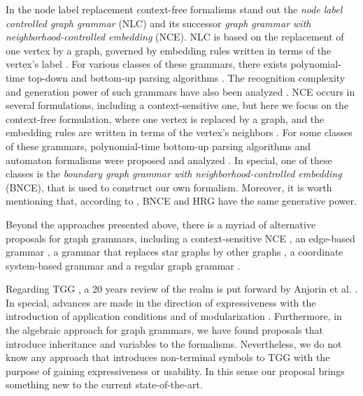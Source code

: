 In the node label replacement context-free formalisms stand out the  \textit{node label controlled graph grammar} (NLC) and its successor \textit{graph grammar with neighborhood-controlled embedding} (NCE). NLC is based on the replacement of one vertex by a graph, governed by embedding rules written in terms of the vertex's label \cite{rozenberg1986boundary}. For various classes of these grammars, there exists polynomial-time top-down and bottom-up parsing algorithms \cite{flasinski1993parsing,flasinski2014characteristics, rozenberg1986boundary, wanke1991algorithms}. The recognition complexity and generation power of such grammars have also been analyzed \cite{flasinski1998power,kim2012structure}. NCE occurs in several formulations, including a context-sensitive one, but here we focus on the context-free formulation, where one vertex is replaced by a graph, and the embedding rules are written in terms of the vertex's neighbors \cite{janssens1982graph,skodinis1998neighborhood}. For some classes of these grammars, polynomial-time bottom-up parsing algorithms and automaton formalisms were proposed and analyzed \cite{kim2001efficient,brandenburg2005finite}. In special, one of these classes is the \textit{boundary graph grammar with neighborhood-controlled embedding} (BNCE), that is used to construct our own formalism. Moreover, it is worth mentioning that, according to \cite{engelfiet1990comparison}, BNCE and HRG have the same generative power.

Beyond the approaches presented above, there is a myriad of alternative proposals for graph grammars, including a context-sensitive NCE \cite{adachi1999nce}, an edge-based grammar \cite{shi2015method}, a grammar that replaces star graphs by other graphs \cite{drewes2010adaptive}, a coordinate system-based grammar \cite{kong2006spatial} and a regular graph grammar \cite{gilroy2017parsing}.

Regarding TGG \cite{schurr1994specification}, a 20 years review of the realm is put forward by Anjorin et al. \cite{anjorin201620}. In special, advances are made in the direction of expressiveness with the introduction of application conditions \cite{klar2010extended} and of modularization \cite{anjorin2014modularizing}. Furthermore, in the algebraic approach for graph grammars, we have found proposals that introduce inheritance \cite{bardohl2004integrating,hermann2008typed} and variables \cite{hoffmann2005graph} to the formalisms. Nevertheless, we do not know any approach that introduces non-terminal symbols to TGG with the purpose of gaining expressiveness or usability. In this sense our proposal brings something new to the current state-of-the-art.